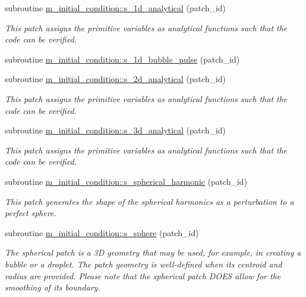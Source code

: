 \begin{DoxyCompactItemize}
subroutine \hyperlink{namespacem__initial__condition_a3b4fe978231e74b699695a35fb544236}{m\+\_\+initial\+\_\+condition\+::s\+\_\+1d\+\_\+analytical} (patch\+\_\+id)
\begin{DoxyCompactList}\small\item\em This patch assigns the primitive variables as analytical functions such that the code can be verified. \end{DoxyCompactList}\item 
subroutine \hyperlink{namespacem__initial__condition_a7685befab45f10089fc46907fa4cc049}{m\+\_\+initial\+\_\+condition\+::s\+\_\+1d\+\_\+bubble\+\_\+pulse} (patch\+\_\+id)
\item 
subroutine \hyperlink{namespacem__initial__condition_a50f5727753c025d26925640a19259102}{m\+\_\+initial\+\_\+condition\+::s\+\_\+2d\+\_\+analytical} (patch\+\_\+id)
\begin{DoxyCompactList}\small\item\em This patch assigns the primitive variables as analytical functions such that the code can be verified. \end{DoxyCompactList}\item 
subroutine \hyperlink{namespacem__initial__condition_abb87c531b4d42302dd22863b95a7cdb2}{m\+\_\+initial\+\_\+condition\+::s\+\_\+3d\+\_\+analytical} (patch\+\_\+id)
\begin{DoxyCompactList}\small\item\em This patch assigns the primitive variables as analytical functions such that the code can be verified. \end{DoxyCompactList}\item 
subroutine \hyperlink{namespacem__initial__condition_af17f90ba4a3878feb6e38bc8d66cb950}{m\+\_\+initial\+\_\+condition\+::s\+\_\+spherical\+\_\+harmonic} (patch\+\_\+id)
\begin{DoxyCompactList}\small\item\em This patch generates the shape of the spherical harmonics as a perturbation to a perfect sphere. \end{DoxyCompactList}\item 
subroutine \hyperlink{namespacem__initial__condition_a9037159f591341d05fa5fb23fe82bc2c}{m\+\_\+initial\+\_\+condition\+::s\+\_\+sphere} (patch\+\_\+id)
\begin{DoxyCompactList}\small\item\em The spherical patch is a 3D geometry that may be used, for example, in creating a bubble or a droplet. The patch geometry is well-\/defined when its centroid and radius are provided. Please note that the spherical patch D\+O\+ES allow for the smoothing of its boundary. \end{DoxyCompactList}\item 

\end{DoxyCompactItemize}
